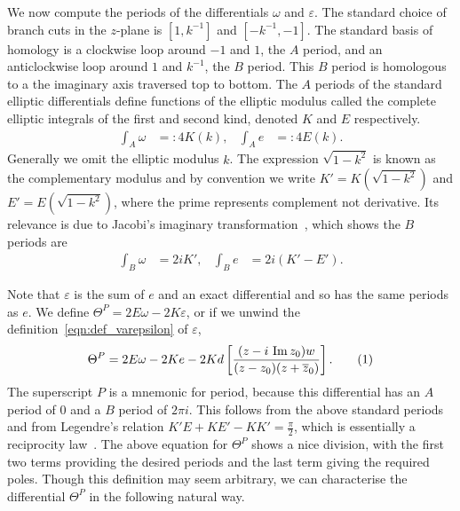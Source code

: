 \documentclass{article}
\numberwithin{equation}{section}
\numberwithin{figure}{section}
\newcommand{\labelthis}[1]{\addtocounter{equation}{1}\tag{\theequation}\label{#1}}
\renewcommand*{\bar}{\overline}
\DeclareMathOperator{\Imag}{Im}
\newcommand{\iu}{i}
\begin{document}
We now compute the periods of the differentials $\omega$ and $\varepsilon$. 
The standard choice of branch cuts in the $z$-plane is $[1,k^{-1}]$ and $[-k^{-1},-1]$. The standard basis of homology is a clockwise loop around $-1$ and $1$, the $A$ period, and an anticlockwise loop around $1$ and $k^{-1}$, the $B$ period. This $B$ period is homologous to a the imaginary axis traversed top to bottom. 
The $A$ periods of the standard elliptic differentials define functions of the elliptic modulus called the complete elliptic integrals of the first and second kind, denoted $K$ and $E$ respectively.
\begin{align*}
    \int_{A} \omega &=: 4K(k), &
    \int_{A} e &=: 4E(k).
\end{align*}
Generally we omit the elliptic modulus $k$.
The expression $\sqrt{1-k^2}$ is known as the complementary modulus and by convention we write $K' = K(\sqrt{1-k^2})$ and $E' = E(\sqrt{1-k^2})$, where the prime represents complement not derivative. 
Its relevance is due to Jacobi's imaginary transformation~\cite[p. 34]{Jacobi1829}, which shows the $B$ periods are
\begin{align*}
\int_{B} \omega &= 2\iu K', &
\int_{B} e &= 2\iu(K'-E').
\end{align*}

Note that $\varepsilon$ is the sum of $e$ and an exact differential and so has the same periods as $e$. We define $\Theta^P = 2E\omega - 2K\varepsilon$, or if we unwind the definition~\eqref{eqn:def_varepsilon} of $\varepsilon$,
\[
\Theta^P = 2E \omega - 2Ke - 2K d\left[ \frac{(z-\iu\,\Imag z_0)w}{(z-z_0)(z + \bar{z}_0)} \right].
\labelthis{eqn:thetaP}
\]
The superscript $P$ is a mnemonic for period, because this differential has an $A$ period of $0$ and a $B$ period of $2\pi\iu$. This follows from the above standard periods and from Legendre's relation $K'E + KE' - KK' = \frac{\pi}{2}$,
which is essentially a reciprocity law~\cite{Griffiths1994}.
The above equation for $\Theta^P$ shows a nice division, with the first two terms providing the desired periods and the last term giving the required poles. Though this definition may seem arbitrary, we can characterise the differential $\Theta^P$ in the following natural way.
\end{document}
